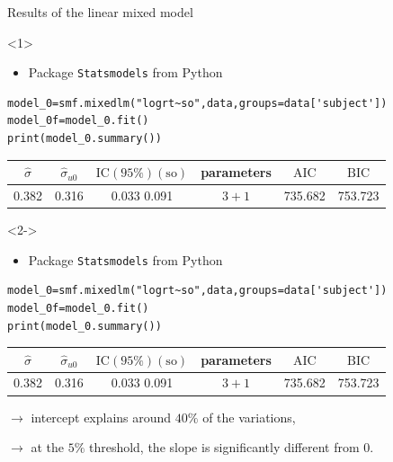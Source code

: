 \documentclass[unknownkeysallowed]{beamer}
\newcommand*{\AIC}{\mathrm{AIC}}
\newcommand*{\BIC}{\mathrm{BIC}}
\begin{document}
\begin{frame}[fragile]{Results of the linear mixed model}
\begin{onlyenv}<1>
\begin{itemize}
    \item Package \texttt{Statsmodels} from Python
\end{itemize}
\begin{lstlisting}
model_0=smf.mixedlm("logrt~so",data,groups=data['subject'])
model_0f=model_0.fit()
print(model_0.summary())
\end{lstlisting}

\begin{center}
    \begin{tabular}{|c|c|c|c|c|c|}
    \hline
         $\hat{\sigma}$ & $\hat{\sigma}_{u0}$ & $\text{IC}(95\%)(\text{so})$ & parameters & $\AIC$ & $\BIC$ \\
         \hline \hline
         0.382 & 0.316 & 0.033 0.091 & $3+1$ & 735.682 & 753.723 \\
         \hline
    \end{tabular}
\end{center}
\end{onlyenv}
\begin{onlyenv}<2->
\begin{itemize}
    \item Package \texttt{Statsmodels} from Python
\end{itemize}
\begin{lstlisting}
model_0=smf.mixedlm("logrt~so",data,groups=data['subject'])
model_0f=model_0.fit()
print(model_0.summary())
\end{lstlisting}

\begin{center}
    \begin{tabular}{|c|c|c|c|c|c|}
    \hline
         $\hat{\sigma}$ & $\hat{\sigma}_{u0}$ & $\text{IC}(95\%)(\text{so})$ & parameters & $\AIC$ & $\BIC$ \\
         \hline \hline
         0.382 & 0.316 & 0.033 0.091 & $3+1$ & 735.682 & 753.723 \\
         \hline
    \end{tabular}
\end{center}

$\longrightarrow$ intercept explains around $40\%$ of the variations,

$\longrightarrow$  at the $5\%$ threshold, the slope is significantly different from $0$.
\end{onlyenv}
\end{frame}
\end{document}
